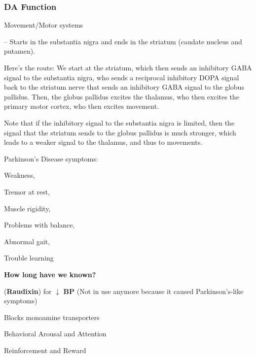 \subsubsection{DA Function}

\begin{coloredlist}
    \item Movement/Motor systems
    \begin{coloredlist}
        \item {} -- Starts in the substantia nigra and ends in the striatum (caudate nucleus and putamen).
        \item Here's the route: We start at the striatum, which then sends an inhibitory GABA signal to the substantia nigra, who sends a reciprocal inhibitory DOPA signal back to the striatum nerve that sends an inhibitory GABA signal to the globus pallidus. Then, the globus pallidus excites the thalamus, who then excites the primary motor cortex, who then excites movement.
        \begin{coloredlist}
            \item Note that if the inhibitory signal to the substantia nigra is limited, then the signal that the striatum sends to the globus pallidus is much stronger, which leads to a weaker signal to the thalamus, and thus to movements.
        \end{coloredlist}
        \item Parkinson's Disease symptoms:
        \begin{coloredlist}
            \item Weakness,
            \item Tremor at rest,
            \item Muscle rigidity,
            \item Problems with balance,
            \item Abnormal gait,
            \item Trouble learning
        \end{coloredlist}
        \item \textbf{How long have we known?}
        \begin{coloredlist}
            \item {} (\textbf{Raudixin}) for \(\downarrow\) \textbf{BP} (Not in use anymore because it caused Parkinson's-like symptoms)
            \begin{coloredlist}
                \item Blocks monoamine transporters
            \end{coloredlist}
        \end{coloredlist}
    \end{coloredlist}
    \item Behavioral Arousal and Attention
    \item Reinforcement and Reward
\end{coloredlist}


